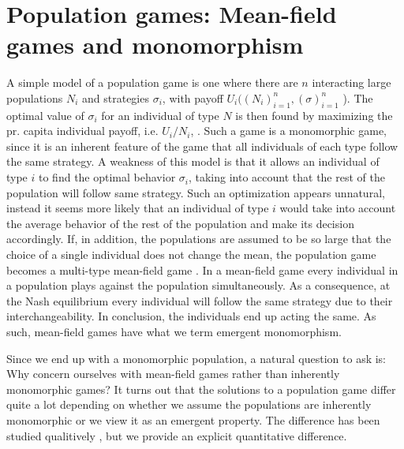 
\section{Population games: Mean-field games and monomorphism}




A simple model of a population game is one where there are $n$ interacting large populations $N_i$ and strategies $\sigma_i$, with payoff $U_i((N_i)_{i=1}^n,(\sigma)_{i=1}^{n}$ ). The optimal value of $\sigma_i$ for an individual of type $N$ is then found by maximizing the pr. capita individual payoff, i.e. $U_i/N_i$, \citep{vincent2005evolutionary}. Such a game is a monomorphic game, since it is an inherent feature of the game that all individuals of each type follow the same strategy. A weakness of this model is that it allows an individual of type $i$ to find the optimal behavior $\sigma_i$, taking into account that the rest of the population will follow same strategy. Such an optimization appears unnatural, instead it seems more likely that an individual of type $i$ would take into account the average behavior of the rest of the population and make its decision accordingly.
If, in addition, the populations are assumed to be so large that the choice of a single individual does not change the mean, the population game becomes a multi-type mean-field game \citep{blanchet2016optimal, aumann1964markets}. In a mean-field game every individual in a population plays against the population simultaneously. As a consequence, at the Nash equilibrium every individual will follow the same strategy due to their interchangeability. In conclusion, the individuals end up acting the same. As such, mean-field games have what we term emergent monomorphism. %

Since we end up with a monomorphic population, a natural question to ask is: Why concern ourselves with mean-field games rather than inherently monomorphic games? It turns out that the solutions to a population game differ quite a lot depending on whether we assume the populations are inherently monomorphic or we view it as an emergent property. The difference has been studied qualitively \citep{kvrivan2008ideal,collet2019algorithmic}, but we provide an explicit quantitative difference.

